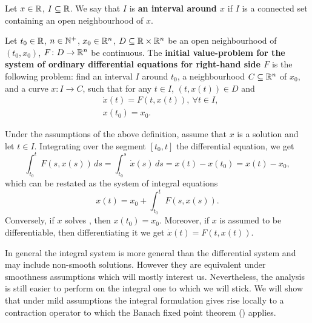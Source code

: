 \begin{definition}
  Let $x \in \mathbb{R}$, $I \subseteq \mathbb{R}$.
  We say that $I$ is \textbf{an interval around $x$} if $I$ is a connected set
  containing an open neighbourhood of $x$.
\end{definition}
\begin{definition}
  Let
    $t_0 \in \mathbb{R}$,
    $n \in \mathbb{N}^+$,
    $x_0 \in \mathbb{R}^n$,
    $D \subseteq \mathbb{R} \times \mathbb{R}^n$ be an open neighbourhood of $(t_0, x_0)$,
    $F \colon D \to \mathbb{R}^n$ be continuous.
  The \textbf{initial value-problem for the system of ordinary differential
  equations for right-hand side $F$} is the following problem: find
    an interval $I$ around $t_0$,
    a neighbourhood $C \subseteq \mathbb{R}^n$ of $x_0$,
    and a curve $x \colon I \to C$,
  such that for any $t \in I$, $(t, x(t)) \in D$ and
  \begin{subequations}
    \label{equation:ordinary_differential_equation/initial_value_problem}
    \begin{alignat}{1}
      & \dot{x}(t) = F(t, x(t)),\ \forall t \in I, \\
      & x(t_0) = x_0.
    \end{alignat}
  \end{subequations}
\end{definition}
\begin{discussion}
  Under the assumptions of the above definition, assume that $x$ is a solution
  and let $t \in I$.
  Integrating over the segment $[t_0, t]$ the differential equation, we get
  \begin{equation}
    \int_{t_0}^t F(s, x(s))\, d s
    = \int_{t_0}^s \dot{x}(s)\, d s
    = x(t) - x(t_0)
    = x(t) - x_0,
  \end{equation}
  which can be restated as the system of integral equations
  \begin{equation}
    \label{equation:ordinary_differential_equation/initial_value_problem/integral}
    x(t) = x_0 + \int_{t_0}^t F(s, x(s)).
  \end{equation}
  Conversely, if $x$ solves
  ,
  then $x(t_0) = x_0$.
  Moreover, if $x$ is assumed to be differentiable, then differentiating it we
  get $\dot{x}(t) = F(t, x(t))$.

  In general the integral system
  is more general than the differential system
  and may include non-smooth solutions.
  However they are equivalent under smoothness assumptions which will mostly
  interest us.
  Nevertheless, the analysis is still easier to perform on the integral one to
  which we will stick.
  We will show that under mild assumptions the integral formulation gives rise
  locally to a contraction operator to which the Banach fixed point theorem
  () applies.
\end{discussion}
